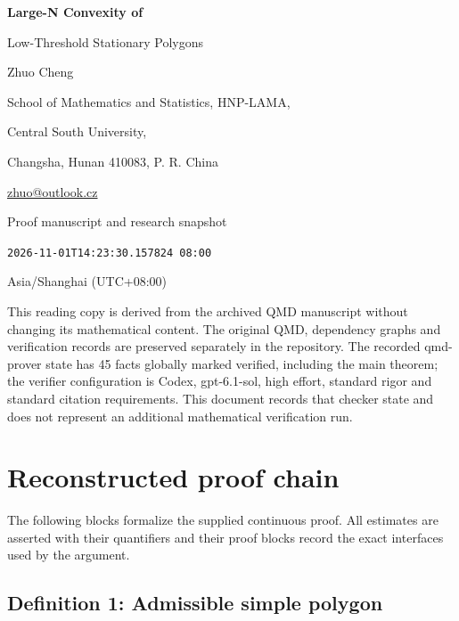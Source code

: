 \documentclass[11pt]{article}
\begin{document}
\begin{titlepage}
\centering
\vspace*{18mm}
{\LARGE\bfseries Large-N Convexity of\par Low-Threshold Stationary Polygons\par}
\vspace{12mm}
{\large Zhuo Cheng\par}
\vspace{5mm}
School of Mathematics and Statistics, HNP-LAMA,\par
Central South University,\par
Changsha, Hunan 410083, P. R. China\par
\vspace{3mm}
\href{mailto:zhuo@outlook.cz}{zhuo@outlook.cz}\par
\vspace{14mm}
{\large Proof manuscript and research snapshot\par}
\vspace{6mm}
\texttt{2026-11-01T14:23:30.157824 08:00}\par
Asia/Shanghai (UTC+08:00)\par
\vfill
\begin{minipage}{0.88\textwidth}
\small
This reading copy is derived from the archived QMD manuscript without changing
its mathematical content. The original QMD, dependency graphs and verification
records are preserved separately in the repository. The recorded qmd-prover
state has 45 facts globally marked verified, including the main theorem;
the verifier configuration is Codex, gpt-6.1-sol, high effort, standard rigor
and standard citation requirements. This document records that checker state
and does not represent an additional mathematical verification run.
\end{minipage}
\vspace{8mm}
\end{titlepage}
\tableofcontents
\clearpage
\section{Reconstructed proof chain}\label{reconstructed-proof-chain}

The following blocks formalize the supplied continuous proof. All
estimates are asserted with their quantifiers and their proof blocks
record the exact interfaces used by the argument.

\subsection{Definition 1: Admissible simple
polygon}\label{def-admissible-polygon}
\end{document}
